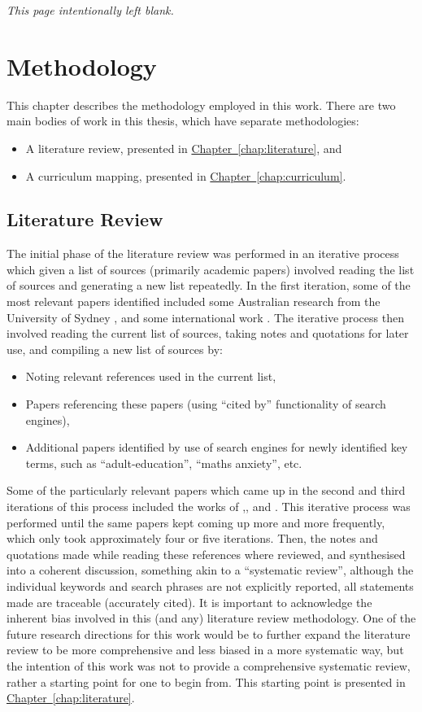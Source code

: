 \documentclass[twoside,12pt,a4paper]{report}
\makeatletter
\newcommand*{\intentionallyblankpage}{
  \vspace*{\fill}
  {\centering \textit{This page intentionally left blank.} \par}
  \vspace{\fill}}
\renewcommand*{\cleardoublepage}{\clearpage\if@twoside \ifodd\c@page\else
  \intentionallyblankpage
  \newpage
  \if@twocolumn\hbox{}\newpage\fi\fi\fi}
\newcommand{\refchap}[1]{\hyperref[chap:#1]{Chapter~\ref{chap:#1}}}
\makeatother
\begin{document}
\cleardoublepage
\chapter{Methodology}
\label{chap:methodology}

This chapter describes the methodology employed in this work. There are two main bodies of work in this thesis, which have separate methodologies:
\begin{itemize}
	\item A literature review, presented in \refchap{literature}, and 
	\item A curriculum mapping, presented in \refchap{curriculum}.
\end{itemize}

\section{Literature Review}

The initial phase of the literature review was performed in an iterative process which given a list of sources (primarily academic papers) involved reading the list of sources and generating a new list repeatedly. In the first iteration, some of the most relevant papers identified included some Australian research from the University of Sydney \cite{Nicholas2015, Gordon2013}, and some international work \cite{Johnson2016}. The iterative process then involved reading the current list of sources, taking notes and quotations for later use, and compiling a new list of sources by:
\begin{itemize}
	\item Noting relevant references used in the current list, 
	\item Papers referencing these papers (using ``cited by'' functionality of search engines),
	\item Additional papers identified by use of search engines for newly identified key terms, such as ``adult-education'', ``maths anxiety'', etc.
\end{itemize}
Some of the particularly relevant papers which came up in the second and third iterations of this process included the works of  ,, and . This iterative process was performed until the same papers kept coming up more and more frequently, which only took approximately four or five iterations. Then, the notes and quotations made while reading these references where reviewed, and synthesised into a coherent discussion, something akin to a ``systematic review'', although the individual keywords and search phrases are not explicitly reported, all statements made are traceable (accurately cited). It is important to acknowledge the inherent bias involved in this (and any) literature review methodology. One of the future research directions for this work would be to further expand the literature review to be more comprehensive and less biased in a more systematic way, but the intention of this work was not to provide a comprehensive systematic review, rather a starting point for one to begin from. This starting point is presented in \refchap{literature}.
\end{document}
